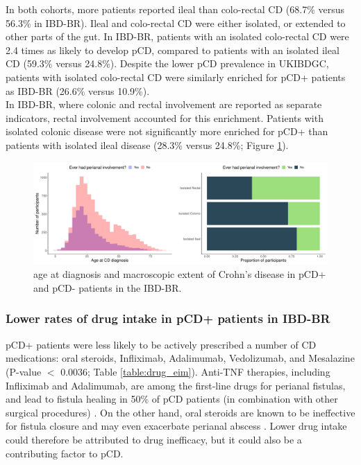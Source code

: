 In both cohorts, more patients reported ileal than colo-rectal CD (68.7\% versus 56.3\% in IBD-BR). Ileal and colo-rectal CD were either isolated, or extended to other parts of the gut. In IBD-BR, patients with an isolated colo-rectal CD were 2.4 times as likely to develop pCD, compared to patients with an isolated ileal CD (59.3\% versus 24.8\%).  Despite the lower pCD prevalence in UKIBDGC, patients with isolated colo-rectal CD were similarly enriched for pCD+ patients as IBD-BR (26.6\% versus 10.9\%). \\

In IBD-BR, where colonic and rectal involvement are reported as separate indicators, rectal involvement accounted for this enrichment. Patients with isolated colonic disease were not significantly more enriched for pCD+ than patients with isolated ileal disease (28.3\% versus 24.8\%; Figure \ref{fig:age_diag_macextent}).
\begin{figure}[htbp!] 
  \centering    
  \includegraphics[width=1.0\textwidth]{fig1}
  \caption[Figure]{age at diagnosis and macroscopic extent of Crohn's disease in pCD+ and pCD- patients in the IBD-BR.}
  \label{fig:age_diag_macextent}
  \end{figure}

\subsubsection{Lower rates of drug intake in pCD+ patients in IBD-BR}
pCD+ patients were less likely to be actively prescribed a number of CD medications: oral steroids, Infliximab, Adalimumab, Vedolizumab, and Mesalazine (P-value $<$ 0.0036; Table \ref{table:drug_eim}). Anti-TNF therapies, including Infliximab and Adalimumab, are among the first-line drugs for perianal fistulas, and lead to fistula healing in 50\% of pCD patients (in combination with other surgical procedures) \cite{Regueiro2003-lf,Kotze2014-fh,Haennig2015-pj,Gaertner2007-wb}. On the other hand, oral steroids are known to be ineffective for fistula closure and may even exacerbate perianal abscess \cite{Jones1966-tt}. Lower drug intake could therefore be attributed to drug inefficacy, but it could also be a contributing factor to pCD.\\

